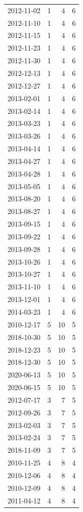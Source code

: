 \begin{tabular}{lrrr}
2012-11-02 & 1 & 4 & 6 \\
2012-11-10 & 1 & 4 & 6 \\
2012-11-15 & 1 & 4 & 6 \\
2012-11-23 & 1 & 4 & 6 \\
2012-11-30 & 1 & 4 & 6 \\
2012-12-13 & 1 & 4 & 6 \\
2012-12-27 & 1 & 4 & 6 \\
2013-02-01 & 1 & 4 & 6 \\
2013-02-14 & 1 & 4 & 6 \\
2013-03-23 & 1 & 4 & 6 \\
2013-03-26 & 1 & 4 & 6 \\
2013-04-14 & 1 & 4 & 6 \\
2013-04-27 & 1 & 4 & 6 \\
2013-04-28 & 1 & 4 & 6 \\
2013-05-05 & 1 & 4 & 6 \\
2013-08-20 & 1 & 4 & 6 \\
2013-08-27 & 1 & 4 & 6 \\
2013-09-15 & 1 & 4 & 6 \\
2013-09-22 & 1 & 4 & 6 \\
2013-09-28 & 1 & 4 & 6 \\
2013-10-26 & 1 & 4 & 6 \\
2013-10-27 & 1 & 4 & 6 \\
2013-11-10 & 1 & 4 & 6 \\
2013-12-01 & 1 & 4 & 6 \\
2014-03-23 & 1 & 4 & 6 \\
2010-12-17 & 5 & 10 & 5 \\
2018-10-30 & 5 & 10 & 5 \\
2018-12-23 & 5 & 10 & 5 \\
2018-12-30 & 5 & 10 & 5 \\
2020-06-13 & 5 & 10 & 5 \\
2020-06-15 & 5 & 10 & 5 \\
2012-07-17 & 3 & 7 & 5 \\
2012-09-26 & 3 & 7 & 5 \\
2013-02-03 & 3 & 7 & 5 \\
2013-02-24 & 3 & 7 & 5 \\
2018-11-09 & 3 & 7 & 5 \\
2010-11-25 & 4 & 8 & 4 \\
2010-12-06 & 4 & 8 & 4 \\
2010-12-09 & 4 & 8 & 4 \\
2011-04-12 & 4 & 8 & 4 \\

\end{tabular}
